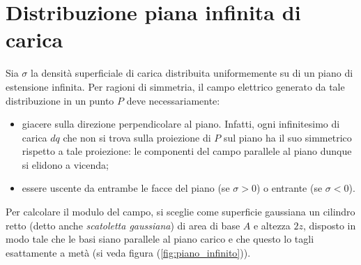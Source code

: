 \documentclass[a4paper,11pt]{report}
\begin{document}
\section{Distribuzione piana infinita di carica}
Sia $\sigma$ la densità superficiale di carica distribuita uniformemente su di un piano di estensione infinita.
Per ragioni di simmetria, il campo elettrico generato da tale distribuzione in un punto $P$ deve necessariamente:
\begin{itemize}
    \item giacere sulla direzione perpendicolare al piano. Infatti, ogni infinitesimo di carica $dq$ che non si trova sulla proiezione di $P$ sul piano ha il suo simmetrico rispetto a tale proiezione: le componenti del campo parallele al piano dunque si elidono a vicenda;
       \item essere uscente da entrambe le facce del piano (se $\sigma > 0$) o entrante (se $\sigma < 0$).
\end{itemize}
Per calcolare il modulo del campo, si sceglie come superficie gaussiana un cilindro retto (detto anche \textit{scatoletta gaussiana}) di area di base $A$ e altezza $2z$, disposto in modo tale che le basi siano parallele al piano carico e che questo lo tagli esattamente a metà (si veda figura (\ref{fig:piano_infinito})).
\end{document}
